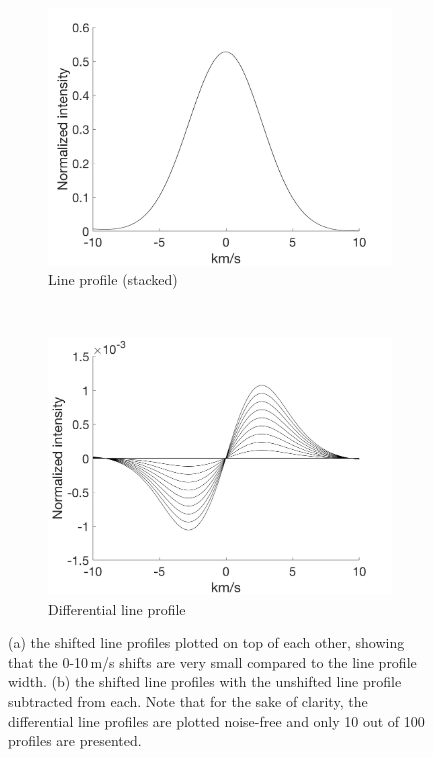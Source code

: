 \begin{figure}[tbp]
    \begin{subfigure}[b]{0.49\textwidth}
        \includegraphics[width=\textwidth]{./Figures/Methods/1-Line_Profile.png}
        \caption{Line profile (stacked)}
        \label{fig:line_profiles}
    \end{subfigure}
	~
    \begin{subfigure}[b]{0.49\textwidth}
        \includegraphics[width=\textwidth]{./Figures/Methods/1-Differential_line_Profile.png}
        \caption{Differential line profile}
        \label{fig:differential_line_profiles}
    \end{subfigure}	
    
    \caption[100 shifted HARPS-like line profiles]{(a) the shifted line profiles plotted on top of each other, showing that the 0-10\,m/s shifts are very small compared to the line profile width. (b) the shifted line profiles with the unshifted line profile subtracted from each. Note that for the sake of clarity, the differential line profiles are plotted noise-free and only 10 out of 100 profiles are presented.}
\label{fig:line_profiles12}
\end{figure}	

